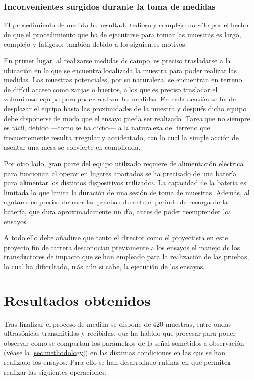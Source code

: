 \subsubsection{Inconvenientes surgidos durante la toma de medidas}

El procedimiento de medida ha resultado tedioso y complejo no sólo por el
hecho de que el procedimiento que ha de ejecutarse para tomar las muestras
es largo, complejo y fatigoso; también debido a los siguientes motivos.

En primer lugar, al realizarse medidas de campo, es preciso trasladarse a
la ubicación en la que se encuentra localizada la muestra para poder
realizar las medidas. Las muestras potenciales, por su naturaleza, se
encuentran en terreno de difícil acceso como zanjas o huertos, a los que es
preciso trasladar el voluminoso equipo para poder realizar las medidas. En
cada ocasión se ha de desplazar el equipo hasta las proximidades de la
muestra y después dicho equipo debe disponerse de modo que el ensayo pueda
ser realizado. Tarea que no siempre es fácil, debido ---como se ha dicho---
a la naturaleza del terreno que frecuentemente resulta irregular y
accidentado, con lo cual la simple acción de asentar una mesa se convierte
en complicada.

Por otro lado, gran parte del equipo utilizado requiere de alimentación
eléctrica para funcionar, al operar en lugares apartados se ha precisado de
una batería para alimentar los distintos dispositivos utilizados. La
capacidad de la batería es limitada lo que limita la duración de una sesión
de toma de muestras. Además, al agotarse es preciso detener las pruebas
durante el periodo de recarga de la batería, que dura aproximadamente un
día, antes de poder reemprender los ensayos.

A todo ello debe añadirse que tanto el director como el proyectista en este
proyecto fin de carrera desconocían previamente a los ensayos el manejo de
los transductores de impacto que se han empleado para la realización de las
pruebas, lo cual ha dificultado, más aún si cabe, la ejecución de los
ensayos.


\section{Resultados obtenidos}

Tras finalizar el proceso de medida se dispone de 420 muestras, entre ondas
ultrasónicas transmitidas y recibidas, que ha habido que procesar para
poder observar como se comportan los parámetros de la señal sometidos a
observación (véase la \vref{sec:methodology}) en las distintas condiciones
en las que se han realizado los ensayos. Para ello se han desarrollado
rutinas en \matlab{} que permiten realizar las siguientes operaciones:

